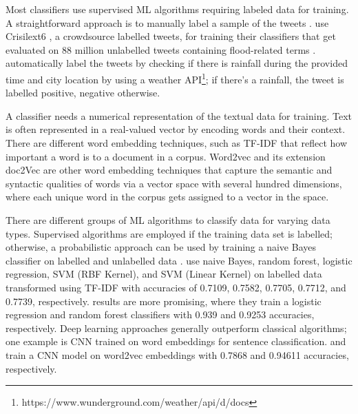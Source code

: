 Most classifiers use supervised \ac{ML} algorithms requiring labeled data for training. A
straightforward approach is to manually label a sample of the tweets
\cite{debruijnGlobalDatabaseHistoric2019b}\cite{barkerDevelopmentNationalscaleRealtime2019}.
 use Crisilext6
\cite{olteanuCrisisLexLexiconCollecting2014}, a crowdsource labelled tweets, for training their
classifiers that get evaluated on 88 million unlabelled tweets containing flood-related terms
\cite{DVN/T3ZFMR_2019}.  automatically label the tweets by
checking if there is rainfall during the provided time and city location by using a weather
\ac{API}\footnote{https://www.wunderground.com/weather/api/d/docs}; if there's a rainfall, the tweet
is labelled positive, negative otherwise.

A classifier needs a numerical representation of the textual data for training. Text is often
represented in a real-valued vector by encoding words and their context. There are different word
embedding techniques, such as \ac{TF-IDF} \cite{enwiki:1123031029} that reflect how important a word
is to a document in a corpus. Word2vec \cite{mikolovEfficientEstimationWord2013} and its extension
doc2Vec \cite{leDistributedRepresentationsSentences2014} are other word embedding techniques that
capture the semantic and syntactic qualities of words via a vector space with several hundred
dimensions, where each unique word in the corpus gets assigned to a vector in the space.

There are different groups of \ac{ML} algorithms to classify data for varying data types. Supervised
algorithms are employed if the training data set is labelled; otherwise, a probabilistic approach
can be used by training a naive Bayes classifier on  labelled and unlabelled data
\cite{liDisasterResponseAided2018}.  use naive Bayes,
random forest, logistic regression, \ac{SVM} (RBF Kernel), and \ac{SVM} (Linear Kernel) on labelled
data transformed using \ac{TF-IDF} with accuracies of 0.7109, 0.7582, 0.7705, 0.7712, and 0.7739,
respectively.  results are more promising,
where they train a logistic regression and random forest classifiers with 0.939 and 0.9253
accuracies, respectively. Deep learning approaches  generally outperform classical algorithms; one
example is \ac{CNN} trained on word embeddings for sentence classification.
\citeauthor{fengExtractionPluvialFlood2018} and
\citeauthor{petersenIdentificationExplorationExtreme2021} train a \ac{CNN} model on word2vec
embeddings with 0.7868 and 0.94611 accuracies, respectively.

